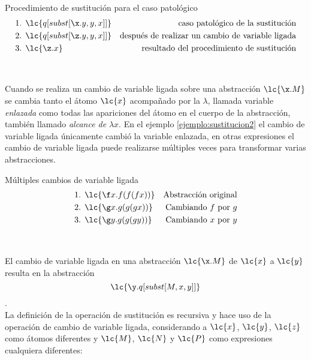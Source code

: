 \begin{ejemplo} Procedimiento de sustitución para el caso patológico
  \label{ejemplo:sustitucion2}
  \begin{align*}
    \text{1. } &\lc{q[subst[\x.y,y,x]]} &\text{caso patológico de la sustitución} \\
    \text{2. } &\lc{q[subst[\z.y,y,x]]} &\text{después de realizar un cambio de variable ligada} \\
    \text{3. } &\lc{\z.x}               &\text{resultado del procedimiento de sustitución}
  \end{align*}
\end{ejemplo} \

Cuando se realiza un cambio de variable ligada sobre una abstracción \(\lc{\x.M}\) se cambia tanto el átomo \(\lc{x}\) acompañado por la \(\lambda\), llamada variable \emph{enlazada} como todas las apariciones del átomo en el cuerpo de la abstracción, también llamado \emph{alcance de} \(\lambda x\). En el ejemplo \ref{ejemplo:sustitucion2} el cambio de variable ligada únicamente cambió la variable enlazada, en otras expresiones el cambio de variable ligada puede realizarse múltiples veces para transformar varias abstracciones. \\

\begin{ejemplo} Múltiples cambios de variable ligada
  \label{ejemplo:variableligada1}
  \begin{align*}
    \text{1. } &\lc{\f x.f(f(f x))} &\text{Abstracción original} \\
    \text{2. } &\lc{\g x.g(g(g x))} &\text{Cambiando \(f\) por \(g\)} \\
    \text{3. } &\lc{\g y.g(g(g y))} &\text{Cambiando \(x\) por \(y\)}
  \end{align*}
\end{ejemplo} \

El cambio de variable ligada en una abstracción \(\lc{\x.M}\) de \(\lc{x}\) a \(\lc{y}\) resulta en la abstracción \[\lc{\y.q[subst[M,x,y]]}\]. \\

La definición de la operación de sustitución es recursiva y hace uso de la operación de cambio de variable ligada, considerando a \(\lc{x}\), \(\lc{y}\), \(\lc{z}\) como átomos diferentes y \(\lc{M}\), \(\lc{N}\) y \(\lc{P}\) como expresiones cualquiera diferentes: \\

